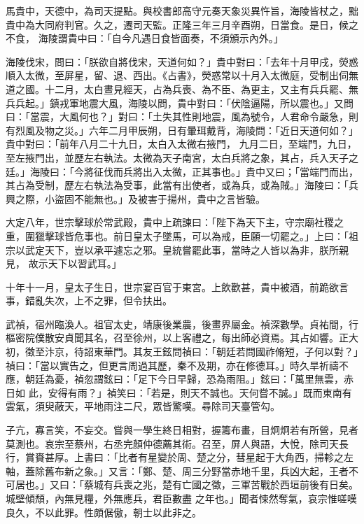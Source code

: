 \begin{pinyinscope}
 馬貴中，天德中，為司天提點。與校書郎高守元奏天象災異忤旨，海陵皆杖之，黜貴中為大同府判官。久之，遷司天監。正隆三年三月辛酉朔，日當食。是日，候之不食，
 海陵謂貴中曰：「自今凡遇日食皆面奏，不須頒示內外。」



 海陵伐宋，問曰：「朕欲自將伐宋，天道何如？」貴中對曰：「去年十月甲戌，熒惑順入太微，至屏星，留、退、西出。《占書》，熒惑常以十月入太微庭，受制出伺無道之國。十二月，太白晝見經天，占為兵喪、為不臣、為更主，又主有兵兵罷、無兵兵起。」鎮戎軍地震大風，海陵以問，貴中對曰：「伏陰逼陽，所以震也。」又問曰：「當震，大風何也？」對曰：「土失其性則地震，風為號令，人君命令嚴急，則有烈風及物之災。」六年二月甲辰朔，日有暈珥戴背，海陵問：「近日天道何如？」貴中對曰：「前年八月二十九日，太白入太微右掖門，
 九月二日，至端門，九日，至左掖門出，並歷左右執法。太微為天子南宮，太白兵將之象，其占，兵入天子之廷。」海陵曰：「今將征伐而兵將出入太微，正其事也。」貴中又曰；「當端門而出，其占為受制，歷左右執法為受事，此當有出使者，或為兵，或為賊。」海陵曰：「兵興之際，小盜固不能無也。」及被害于揚州，貴中之言皆驗。



 大定八年，世宗擊球於常武殿，貴中上疏諫曰：「陛下為天下主，守宗廟社稷之重，圍獵擊球皆危事也。前日皇太子墜馬，可以為戒，臣願一切罷之。」上曰：「祖宗以武定天下，豈以承平遽忘之邪。皇統嘗罷此事，當時之人皆以為非，朕所親見，
 故示天下以習武耳。」



 十年十一月，皇太子生日，世宗宴百官于東宮。上飲歡甚，貴中被酒，前跪欲言事，錯亂失次，上不之罪，但令扶出。



 武禎，宿州臨渙人。祖官太史，靖康後業農，後畫界屬金。禎深數學。貞祐間，行樞密院僕散安貞聞其名，召至徐州，以上客禮之，每出師必資焉。其占如響。正大初，徵至汴京，待詔東華門。其友王鉉問禎曰：「朝廷若問國祚脩短，子何以對？」禎曰：「當以實告之，但更言周過其歷，秦不及期，亦在修德耳。」時久旱祈禱不應，朝廷為憂，禎忽謂鉉曰：「足下今日早歸，恐為雨阻。」鉉曰：「萬里無雲，赤日如
 此，安得有雨？」禎笑曰：「若是，則天不誠也。天何嘗不誠。」既而東南有雲氣，須臾蔽天，平地雨注二尺，眾皆驚嘆。尋除司天臺管勾。



 子亢，寡言笑，不妄交。嘗與一學生終日相對，握籌布畫，目炯炯若有所營，見者莫測也。哀宗至蔡州，右丞完顏仲德薦其術。召至，屏人與語，大悅，除司天長行，賞賚甚厚。上書曰：「比者有星變於周、楚之分，彗星起于大角西，掃軫之左軸，蓋除舊布新之象。」又言：「鄭、楚、周三分野當赤地千里，兵凶大起，王者不可居也。」又曰：「蔡城有兵喪之兆，楚有亡國之徵，三軍苦戰於西垣前後有日矣。城壁傾頹，內無見糧，外無應兵，君臣數盡
 之年也。」聞者悚然奪氣，哀宗惟嗟嘆良久，不以此罪。性頗倨傲，朝士以此非之。




\end{pinyinscope}
